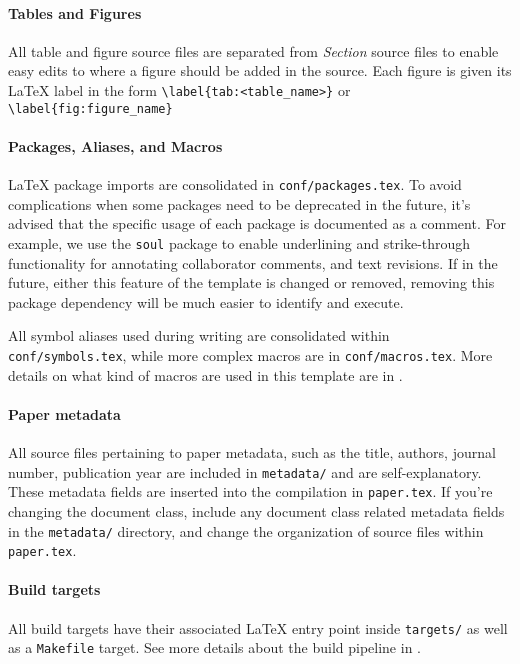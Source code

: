 \paragraph{Tables and Figures}
All table and figure source files are separated from \emph{Section} source files to enable easy edits to where a figure should be added in the source.
Each figure is given its \LaTeX{} label in the form \texttt{\textbackslash label\{tab:<table\_name>\}} or \texttt{\textbackslash label\{fig:figure\_name\}}

\paragraph{Packages, Aliases, and Macros}
\LaTeX{} package imports are consolidated in \texttt{conf/packages.tex}.
To avoid complications when some packages need to be deprecated in the future, it's advised that the specific usage of each package is documented as a comment.
For example, we use the \texttt{soul} package to enable underlining and strike-through functionality for annotating collaborator comments, and text revisions.
If in the future, either this feature of the template is changed or removed, removing this package dependency will be much easier to identify and execute.

All symbol aliases used during writing are consolidated within \texttt{conf/symbols.tex}, while more complex macros are in \texttt{conf/macro\hfill\break s.tex}.
More details on what kind of macros are used in this template are in .

\paragraph{Paper metadata}
All source files pertaining to paper metadata, such as the title, authors, journal number, publication year \etc are included in \texttt{metadata/} and are self-explanatory.
These metadata fields are inserted into the compilation in \texttt{paper.tex}.
If you're changing the document class, include any document class related metadata fields in the \texttt{metadata/} directory, and change the organization of source files within \texttt{paper.tex}.

\paragraph{Build targets}
All build targets have their associated \LaTeX{} entry point inside \texttt{targets/} as well as a  \texttt{Makefile} target.
See more details about the build pipeline in .

